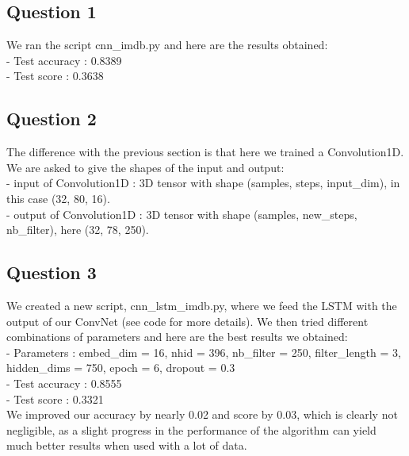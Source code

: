\documentclass[11pt, oneside]{article}   	%
\begin{document}
\subsection{Question 1}

We ran the script cnn\_imdb.py and here are the results obtained:\\
\indent - Test accuracy : 0.8389\\
\indent - Test score : 0.3638

\subsection{Question 2}

The difference with the previous section is that here we trained a Convolution1D. We are asked to give the shapes of the input and output:\\
\indent - input of Convolution1D : 3D tensor with shape (samples, steps, input\_dim), in this case (32, 80, 16).\\
\indent - output of Convolution1D : 3D tensor with shape (samples, new\_steps, nb\_filter), here (32, 78, 250).

\subsection{Question 3}

We created a new script, cnn\_lstm\_imdb.py, where we feed the LSTM with the output of our ConvNet (see code for more details). We then tried different combinations of parameters and here are the best results we obtained:\\
\indent - Parameters : embed\_dim = 16, nhid = 396, nb\_filter = 250, filter\_length = 3, hidden\_dims = 750, epoch = 6, dropout = 0.3\\
\indent - Test accuracy : 0.8555\\
\indent - Test score : 0.3321\\
We improved our accuracy by nearly 0.02 and score by 0.03, which is clearly not negligible, as a slight progress in the performance of the algorithm can yield much better results when used with a lot of data.
\end{document}
